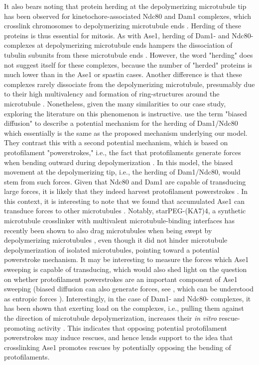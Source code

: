 It also bears noting that protein herding at the depolymerizing microtubule tip has been observed for kinetochore-associated Ndc80 and Dam1 complexes, which crosslink chromosomes to depolymerizing microtubule ends . Herding of these proteins is thus essential for mitosis. As with Ase1, herding of Dam1- and Ndc80- complexes at depolymerizing microtubule ends hampers the dissociation of tubulin subunits from these microtubule ends \parencite{Franck2007, umbreit2012ndc80, grishchuk2017biophysics}. However, the word "herding" does not suggest itself for these complexes, because the number of "herded" proteins is much lower than in the Ase1 or spastin cases. Another difference is that these complexes rarely dissociate from the depolymerizing microtubule, presumably due to their high multivalency  and formation of ring-structures around the microtubule . Nonetheless, given the many similarities to our case study, exploring the literature on this phenomenon is instructive. \cite{grishchuk2017biophysics} use the term "biased diffusion" to describe a potential mechanism for the herding of Dam1/Ndc80 which essentially is the same as the proposed mechanism underlying our model. They contrast this with a second potential mechanism, which is based on protofilament "powerstrokes," i.e., the fact that protofilaments generate forces when bending outward during depolymerization . In this model, the biased movement at the depolymerizing tip, i.e., the herding of Dam1/Ndc80, would stem from such forces. Given that Ndc80 and Dam1 are capable of transducing large forces, it is likely that they indeed harvest protofilament powerstrokes . In this context, it is interesting to note that we found that accumulated Ase1 can transduce forces to other microtubules . Notably, starPEG-(KA7)4, a synthetic microtubule crosslinker with multivalent microtubule-binding interfaces has recently been shown to also drag microtubules when being swept by depolymerizing microtubules \parencite{Drechsler2019}, even though it did not hinder microtubule depolymerization of isolated microtubules, pointing toward a potential powerstroke mechanism. It may be interesting to measure the forces which Ase1 sweeping is capable of transducing, which would also shed light on the question on whether protofilament powerstrokes are an important component of Ase1 sweeping (biased diffusion can also generate forces, see \cite{grishchuk2017biophysics}, which can be understood as entropic forces \cite{lanskydiffusible2015}). Interestingly, in the case of Dam1- and Ndc80- complexes, it has been shown that exerting load on the complexes, i.e., pulling them against the direction of microtubule depolymerization, increases their \textit{in vitro} rescue-promoting activity \parencite{Franck2007, volkov2018multivalency}. This indicates that opposing potential protofilament powerstrokes may induce rescues, and hence lends support to the idea that crosslinking Ase1 promotes rescues by potentially opposing the bending of protofilaments. \par

